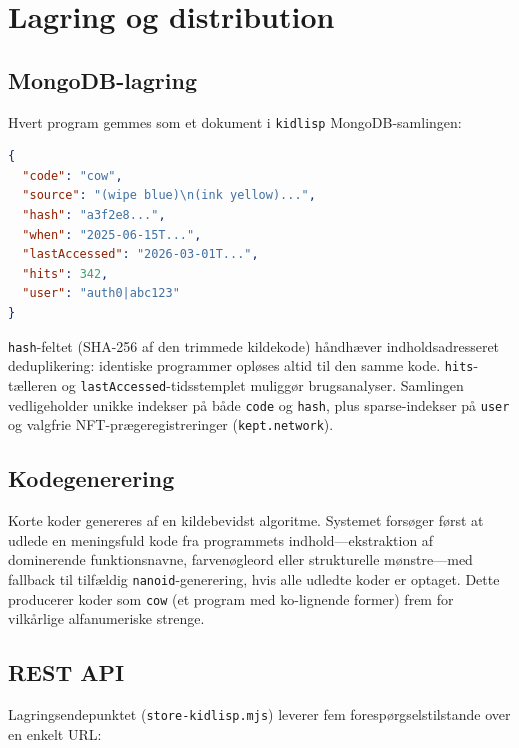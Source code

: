 \documentclass[10pt,letterpaper,twocolumn]{article}
\begin{document}
\section{Lagring og distribution}
\label{sec:infrastructure}

\subsection{MongoDB-lagring}

Hvert program gemmes som et dokument i \texttt{kidlisp} MongoDB-samlingen:

\begin{lstlisting}[language=json]
{
  "code": "cow",
  "source": "(wipe blue)\n(ink yellow)...",
  "hash": "a3f2e8...",
  "when": "2025-06-15T...",
  "lastAccessed": "2026-03-01T...",
  "hits": 342,
  "user": "auth0|abc123"
}
\end{lstlisting}

\texttt{hash}-feltet (SHA-256 af den trimmede kildekode) håndhæver indholdsadresseret deduplikering: identiske programmer opløses altid til den samme kode. \texttt{hits}-tælleren og \texttt{lastAccessed}-tidsstemplet muliggør brugsanalyser. Samlingen vedligeholder unikke indekser på både \texttt{code} og \texttt{hash}, plus sparse-indekser på \texttt{user} og valgfrie NFT-prægeregistreringer (\texttt{kept.network}).

\subsection{Kodegenerering}

Korte koder genereres af en kildebevidst algoritme. Systemet forsøger først at udlede en meningsfuld kode fra programmets indhold---ekstraktion af dominerende funktionsnavne, farvenøgleord eller strukturelle mønstre---med fallback til tilfældig \texttt{nanoid}-generering, hvis alle udledte koder er optaget. Dette producerer koder som \texttt{cow} (et program med ko-lignende former) frem for vilkårlige alfanumeriske strenge.

\subsection{REST API}

Lagringsendepunktet (\texttt{store-kidlisp.mjs}) leverer fem forespørgselstilstande over en enkelt URL:
\end{document}
